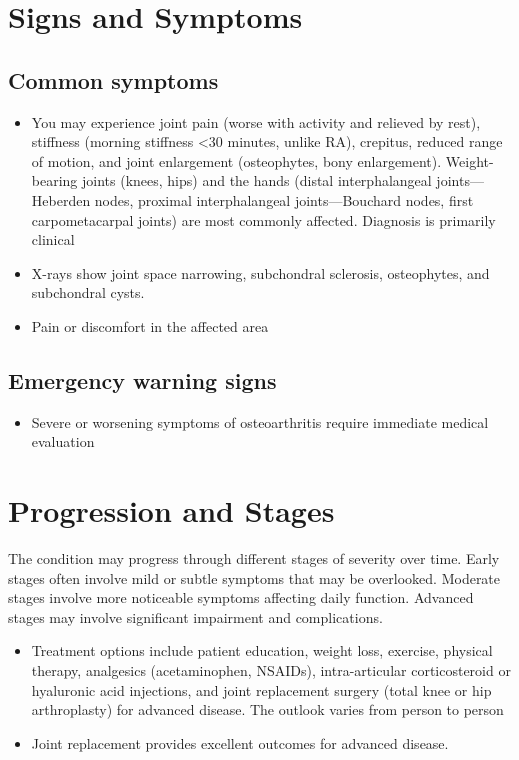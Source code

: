 \section{Signs and Symptoms}

\subsection{Common symptoms}
\begin{itemize}[noitemsep]
  \item You may experience joint pain (worse with activity and relieved by rest), stiffness (morning stiffness <30 minutes, unlike RA), crepitus, reduced range of motion, and joint enlargement (osteophytes, bony enlargement). Weight-bearing joints (knees, hips) and the hands (distal interphalangeal joints---Heberden nodes, proximal interphalangeal joints---Bouchard nodes, first carpometacarpal joints) are most commonly affected. Diagnosis is primarily clinical
  \item X-rays show joint space narrowing, subchondral sclerosis, osteophytes, and subchondral cysts.
  \item Pain or discomfort in the affected area
  \end{itemize}

\subsection{Emergency warning signs}
\begin{itemize}[noitemsep]
  \item Severe or worsening symptoms of osteoarthritis require immediate medical evaluation
\end{itemize}
\section{Progression and Stages}
The condition may progress through different stages of severity over time. Early stages often involve mild or subtle symptoms that may be overlooked. Moderate stages involve more noticeable symptoms affecting daily function. Advanced stages may involve significant impairment and complications.

\begin{itemize}[noitemsep]
  \item Treatment options include patient education, weight loss, exercise, physical therapy, analgesics (acetaminophen, NSAIDs), intra-articular corticosteroid or hyaluronic acid injections, and joint replacement surgery (total knee or hip arthroplasty) for advanced disease. The outlook varies from person to person
  \item Joint replacement provides excellent outcomes for advanced disease.
\end{itemize}
